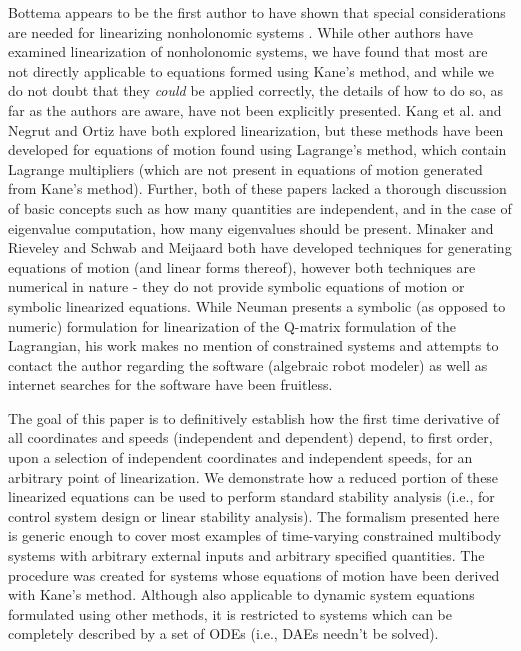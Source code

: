 \documentclass[smallcondensed,final]{svjour3}                     %
\begin{document}
Bottema appears to be the first author to have shown that special
considerations are needed for linearizing nonholonomic systems
\cite{Bottema1949}. While other authors have examined linearization of
nonholonomic systems, we have found that most are not directly applicable to
equations formed using Kane's method, and while we do not doubt that they
\textit{could} be applied correctly, the details of how to do so, as far as the
authors are aware, have not been explicitly presented. Kang et al.
\cite{Kang2003} and Negrut and Ortiz \cite{Negrut2006} have both explored
linearization, but these methods have been developed for equations of motion
found using Lagrange's method, which contain Lagrange multipliers (which are
not present in equations of motion generated from Kane's method). Further, both
of these papers lacked a thorough discussion of basic concepts such as how many
quantities are independent, and in the case of eigenvalue computation, how many
eigenvalues should be present. Minaker and Rieveley \cite{Minaker2010} and
Schwab and Meijaard \cite{Schwab2003} both have developed techniques for
generating equations of motion (and linear forms thereof), however both
techniques are numerical in nature - they do not provide symbolic equations of
motion or symbolic linearized equations. While Neuman presents a symbolic (as
opposed to numeric) formulation for linearization of the Q-matrix formulation
of the Lagrangian\cite{Neuman1984}, his work makes no mention of constrained
systems and attempts to contact the author regarding the software (algebraic
robot modeler) as well as internet searches for the software have been
fruitless.

The goal of this paper is to definitively establish how the first time
derivative of all coordinates and speeds (independent and dependent) depend, to
first order, upon a selection of independent coordinates and independent
speeds, for an arbitrary point of linearization. We demonstrate how a reduced
portion of these linearized equations can be used to perform standard stability
analysis (i.e., for control system design or linear stability analysis). The
formalism presented here is generic enough to cover most examples of
time-varying constrained multibody systems with arbitrary external inputs and
arbitrary specified quantities.
The procedure was created for systems whose equations of motion have been
derived with Kane's method. Although also applicable to dynamic system
equations formulated using other methods, it is restricted to systems which can
be completely described by a set of ODEs (i.e., DAEs needn't be solved).
\end{document}
